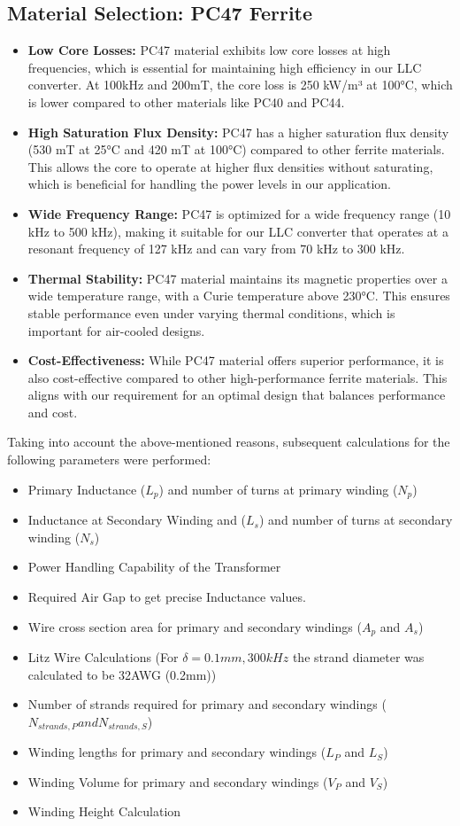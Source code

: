 \subsection{Material Selection: PC47 Ferrite}
\begin{itemize}
    \item \textbf{Low Core Losses:} PC47 material exhibits low core losses at high frequencies, which is essential for maintaining high efficiency in our LLC converter. At 100kHz and 200mT, the core loss is 250 kW/m³ at 100°C, which is lower compared to other materials like PC40 and PC44.
    \item \textbf{High Saturation Flux Density:} PC47 has a higher saturation flux density (530 mT at 25°C and 420 mT at 100°C) compared to other ferrite materials. This allows the core to operate at higher flux densities without saturating, which is beneficial for handling the power levels in our application.
    \item \textbf{Wide Frequency Range:} PC47 is optimized for a wide frequency range (10 kHz to 500 kHz), making it suitable for our LLC converter that operates at a resonant frequency of 127 kHz and can vary from 70 kHz to 300 kHz.
    \item \textbf{Thermal Stability:} PC47 material maintains its magnetic properties over a wide temperature range, with a Curie temperature above 230°C. This ensures stable performance even under varying thermal conditions, which is important for air-cooled designs.
    \item \textbf{Cost-Effectiveness:} While PC47 material offers superior performance, it is also cost-effective compared to other high-performance ferrite materials. This aligns with our requirement for an optimal design that balances performance and cost.
\end{itemize}
Taking into account the above-mentioned reasons, subsequent calculations for the following parameters were performed:
\begin{itemize}
    \item Primary Inductance ($L_p$) and number of turns at primary winding ($N_p$)
    \item Inductance at Secondary Winding and ($L_s$) and number of turns at secondary winding ($N_s$)
    \item Power Handling Capability of the Transformer
    \item Required Air Gap to get precise Inductance values.
    \item Wire cross section area for primary and secondary windings ($A_p$ and $A_s$)
    \item Litz Wire Calculations (For $\delta = 0.1mm, 300kHz$ the strand diameter was calculated to be 32AWG (0.2mm))
    \item Number of strands required for primary and secondary windings ($N_{strands,P} and N_{strands,S}$)
    \item Winding lengths for primary and secondary windings ($L_P$ and $L_S$)
    \item Winding Volume for primary and secondary windings ($V_P$ and $V_S$)
    \item Winding Height Calculation
\end{itemize}
